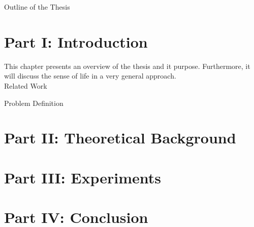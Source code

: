 \clearemptydoublepage

{}

\begin{center}
    \huge{Outline of the Thesis}
\end{center}

\section*{Part I: Introduction}

  \vspace{1mm}
\noindent  This chapter presents an overview of the thesis and it purpose. Furthermore, it will discuss the sense of life in a very general approach.  \\

  \vspace{1mm}
\noindent Related Work

  \vspace{1mm}
\noindent Problem Definition

\section*{Part II: Theoretical Background}

  \vspace{1mm}
  \vspace{1mm}
  \vspace{1mm}

\section*{Part III: Experiments}
  \vspace{1mm}
  \vspace{1mm}

\section*{Part IV: Conclusion}
  \vspace{1mm}
